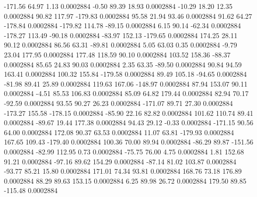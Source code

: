      -171.56       64.97        1.13     0.0002884
       -0.50       89.39       18.93     0.0002884
      -10.29       18.20       12.35     0.0002884
       90.82      117.97     -179.83     0.0002884
       95.58       21.94       93.46     0.0002884
       91.62       64.27     -178.84     0.0002884
     -179.82      114.78      -89.15     0.0002884
        6.15       90.14      -62.34     0.0002884
     -178.27      113.49      -90.18     0.0002884
      -83.97      152.13     -179.65     0.0002884
      174.25       28.11       90.12     0.0002884
       86.56       63.31      -89.81     0.0002884
        5.05       63.03        0.35     0.0002884
       -9.79       23.04      177.95     0.0002884
      177.48      118.59       90.10     0.0002884
      103.52      158.36      -88.37     0.0002884
       85.65       24.83       90.03     0.0002884
        2.35       63.35      -89.50     0.0002884
       90.84       94.59      163.41     0.0002884
      100.32      155.84     -179.58     0.0002884
       89.49      105.18      -94.65     0.0002884
      -81.98       89.41       25.89     0.0002884
      119.63      167.06     -148.97     0.0002884
       87.94      153.07       90.11     0.0002884
       -4.51       85.53      106.83     0.0002884
       85.09       64.82      179.44     0.0002884
       82.94       70.17      -92.59     0.0002884
       93.55       90.27       26.23     0.0002884
     -171.07       89.71       27.30     0.0002884
     -173.27      155.58     -178.15     0.0002884
      -85.90       22.16       82.82     0.0002884
      101.62      110.74       89.41     0.0002884
      -89.67       19.44      177.38     0.0002884
       94.43       29.12       -0.33     0.0002884
     -171.15       90.56       64.00     0.0002884
      172.08       90.37       63.53     0.0002884
       11.07       63.81     -179.93     0.0002884
      167.65      109.43     -179.40     0.0002884
      100.36       70.00       89.94     0.0002884
      -86.29       89.87     -151.56     0.0002884
      -82.99      112.95        0.73     0.0002884
      -75.75       76.00        4.75     0.0002884
        1.81      152.68       91.21     0.0002884
      -97.16       89.62      154.29     0.0002884
      -87.14       81.02      103.87     0.0002884
      -93.77       85.21       15.80     0.0002884
      171.01       74.34       93.81     0.0002884
      168.76       73.18      176.89     0.0002884
       88.29       89.63      153.15     0.0002884
        6.25       89.98       26.72     0.0002884
      179.50       89.85     -115.48     0.0002884

